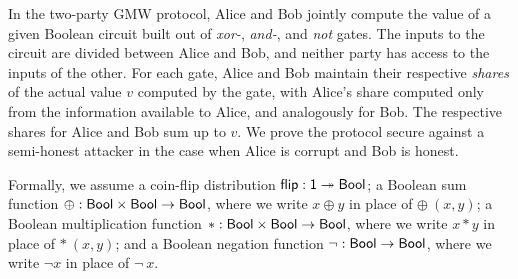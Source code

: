 \renewcommand{\flip}{\mathsf{flip}}
\newcommand{\circuit}{\mathsf{circuit}}
\newcommand{\inputgate}{\textit{input-gate}}
\newcommand{\xorgate}{\textit{xor-gate}}
\newcommand{\andgate}{\textit{and-gate}}
\newcommand{\notgate}{\textit{not-gate}}
\renewcommand{\id}{\mathsf{id}}
\renewcommand{\adv}{\mathsf{adv}}
\newcommand{\A}{\mathsf{A}}
\renewcommand{\Alice}{\mathsf{Alice}}
\newcommand{\AliceOk}{\mathsf{AliceOk}}
\newcommand{\B}{\mathsf{B}}
\renewcommand{\Bob}{\mathsf{Bob}}
\newcommand{\BobOk}{\mathsf{BobOk}}
\newcommand{\Adv}{\mathsf{Adv}}
\newcommand{\BobOTBit}{\mathsf{BobOTBit}}
\renewcommand{\In}{\mathsf{In}}
\newcommand{\InOk}{\mathsf{InOk}}
\renewcommand{\Out}{\mathsf{Out}}
\newcommand{\Wire}{\mathsf{Wire}}
\newcommand{\InputShare}{\mathsf{InputShare}}
\newcommand{\Share}{\mathsf{Share}}
\newcommand{\InputShareOk}{\mathsf{InputShareOk}}
\newcommand{\ShareOk}{\mathsf{ShareOk}}
\newcommand{\LocalBitOk}{\mathsf{LocalBitOk}}
\newcommand{\OTBitOk}{\mathsf{OTBitOk}}
\newcommand{\ObliviousTransfer}{\mathsf{1OutOf4OT}}
\newcommand{\OTBit}{\mathsf{OTBit}}
\renewcommand{\OTMsg}{\mathsf{OTMsg}}
\renewcommand{\OTChoice}{\mathsf{OTChoice}}
\renewcommand{\OTOut}{\mathsf{OTOut}}
\newcommand{\SendInputShare}{\mathsf{SendInputShare}}
\newcommand{\SendFinalShare}{\mathsf{SendFinalShare}}
\newcommand{\LeakIn}{\mathsf{In}}
\newcommand{\LeakInRcvd}{\mathsf{InRcvd}}
\renewcommand{\LeakOut}{\mathsf{Out}}
\newcommand{\LeakInputShare}{\mathsf{InputShare}}
\newcommand{\LeakShare}{\mathsf{Share}}
\newcommand{\LeakSendInputShare}{\mathsf{SendInputShare}}
\newcommand{\LeakSendFinalShare}{\mathsf{SendFinalShare}}
\newcommand{\LeakOTBit}{\mathsf{OTBit}}
\newcommand{\LeakOTMsg}{\mathsf{OTMsg}}
\newcommand{\LeakOTChoiceRcvd}{\mathsf{OTChoiceRcvd}}
\newcommand{\Sim}{\mathsf{Sim}}
\newcommand{\Wires}{\mathsf{Wires}}
\newcommand{\Real}{\mathsf{Real}}

In the two-party GMW protocol, Alice and Bob jointly compute the value of a given Boolean circuit built out of \emph{xor-}, \emph{and-}, and \emph{not} gates. The inputs to the circuit are divided between Alice and Bob, and neither party has access to the inputs of the other. For each gate, Alice and Bob maintain their respective \emph{shares} of the actual value $v$ computed by the gate, with Alice's share computed only from the information available to Alice, and analogously for Bob. The respective shares for Alice and Bob sum up to $v$. We prove the protocol secure against a semi-honest attacker in the case when Alice is corrupt and Bob is honest.

Formally, we assume a coin-flip distribution $\flip : \one \twoheadrightarrow \Bool$; a Boolean sum function $\oplus : \mathsf{Bool} \times \mathsf{Bool} \rightarrow \mathsf{Bool}$, where we write $x \oplus y$ in place of $\oplus \ (x,y)$; a Boolean multiplication function $* : \mathsf{Bool} \times \mathsf{Bool} \rightarrow \mathsf{Bool}$, where we write $x * y$ in place of $* \ (x,y)$; and a Boolean negation function $\neg : \mathsf{Bool} \rightarrow \mathsf{Bool}$, where we write $\neg x$ in place of $\neg \ x$.

